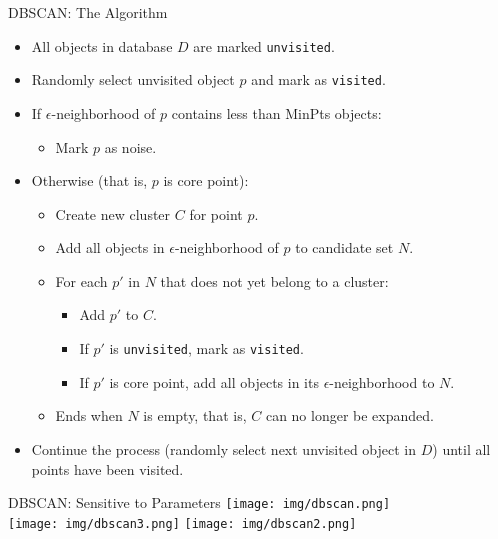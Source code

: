 \begin{frame}{DBSCAN: The Algorithm}
	\begin{itemize}
		\item All objects in database $D$ are marked \texttt{unvisited}.
		\item Randomly select unvisited object $p$ and mark as \texttt{visited}.
		\item If $\epsilon$-neighborhood of $p$ contains less than MinPts
		      objects:
		      \begin{itemize}
			      \item Mark $p$ as noise.
		      \end{itemize}
		\item Otherwise (that is, $p$ is core point):
		      \begin{itemize}
			      \item Create new cluster $C$ for point $p$.
			      \item Add all objects in $\epsilon$-neighborhood of $p$ to
			            candidate set $N$.
			      \item For each $p'$ in $N$ that does not yet belong to a cluster:
			            \begin{itemize}
				            \item Add $p'$ to $C$.
				            \item If $p'$ is \texttt{unvisited}, mark as \texttt{visited}.
				            \item If $p'$ is core point, add all objects in its
				                  $\epsilon$-neighborhood to $N$.
			            \end{itemize}
			      \item Ends when $N$ is empty, that is, $C$ can no longer be
			            expanded.
		      \end{itemize}
		\item Continue the process (randomly select next unvisited object in
		      $D$) until all points have been visited.
	\end{itemize}
\end{frame}

\begin{frame}{DBSCAN: Sensitive to Parameters}
	\centering
	\texttt{[image: img/dbscan.png]}\\
	\texttt{[image: img/dbscan3.png]}
	\texttt{[image: img/dbscan2.png]}
\end{frame}

